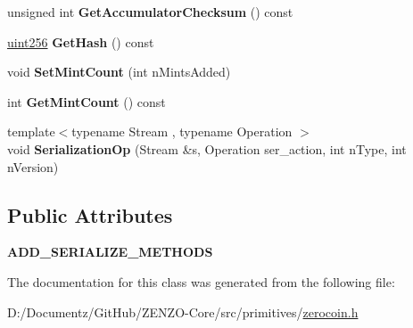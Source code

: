 \begin{DoxyCompactItemize}
\item 
\mbox{\label{class_c_zerocoin_spend_a8f09a6abe64248644b7358bf8f91256f}} 
unsigned int {\bfseries Get\+Accumulator\+Checksum} () const
\item 
\mbox{\label{class_c_zerocoin_spend_acb57c69c7c854a435c12b72251daeeb7}} 
\mbox{\hyperlink{classuint256}{uint256}} {\bfseries Get\+Hash} () const
\item 
\mbox{\label{class_c_zerocoin_spend_a29f5251de7d50fea055b945e1b8fa6a7}} 
void {\bfseries Set\+Mint\+Count} (int n\+Mints\+Added)
\item 
\mbox{\label{class_c_zerocoin_spend_a6ccd7e7c46538ae0097e46a53ddcc6cf}} 
int {\bfseries Get\+Mint\+Count} () const
\item 
\mbox{\label{class_c_zerocoin_spend_a71d0bc62d5b5b5160f14d7e8c875efa0}} 
{\footnotesize template$<$typename Stream , typename Operation $>$ }\\void {\bfseries Serialization\+Op} (Stream \&s, Operation ser\+\_\+action, int n\+Type, int n\+Version)
\end{DoxyCompactItemize}
\subsection*{Public Attributes}
\begin{DoxyCompactItemize}
\item 
\mbox{\label{class_c_zerocoin_spend_ac60ff339759847b91fd3065a41797bf7}} 
{\bfseries A\+D\+D\+\_\+\+S\+E\+R\+I\+A\+L\+I\+Z\+E\+\_\+\+M\+E\+T\+H\+O\+DS}
\end{DoxyCompactItemize}


The documentation for this class was generated from the following file\+:\begin{DoxyCompactItemize}
\item 
D\+:/\+Documentz/\+Git\+Hub/\+Z\+E\+N\+Z\+O-\/\+Core/src/primitives/\mbox{\hyperlink{zerocoin_8h}{zerocoin.\+h}}\end{DoxyCompactItemize}
